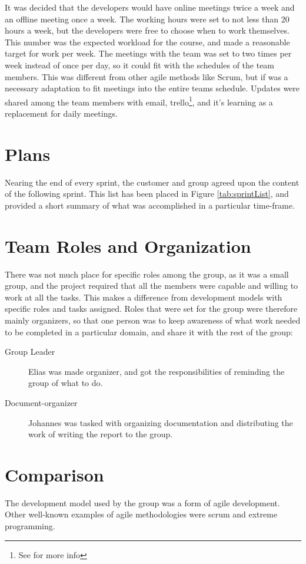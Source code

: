 It was decided that the developers would have online meetings twice a week and an offline meeting once a week. 
The working hours were set to not less than 20 hours a week, but the developers were free to choose when to work themselves. This number was the expected workload for the course, and made a reasonable target for work per week. The meetings with the team was set to two times per week instead of once per day, so it could fit with the schedules of the team members. This was different from other agile methods like Scrum, but if was a necessary adaptation to fit meetings into the entire teams schedule. Updates were shared among the team members with email, trello\footnote{See \pageref{def:trello} for more info}, and it's learning as a replacement for daily meetings.

\section{Plans}

Nearing the end of every sprint, the customer and group agreed upon the content of the following sprint. This list has been placed in Figure \ref{tab:sprintList}, and provided a short summary of what was accomplished in a particular time-frame. 


\section{Team Roles and Organization}
There was not much place for specific roles among the group, as it was a small group, and the project required that all the members were capable and willing to work at all the tasks. This makes a difference from development models with specific roles and tasks assigned. Roles that were set for the group were therefore mainly organizers, so that one person was to keep awareness of what work needed to be completed in a particular domain, and share it with the rest of the group:

\begin{description}

\item[Group Leader] Elias was made organizer, and got the responsibilities of reminding the group of what to do.
\item[Document-organizer] Johannes was tasked with organizing documentation and distributing the work of writing the report to the group. 
\end{description}

\section{Comparison}
The development model used by the group was a form of agile development. Other well-known examples of agile methodologies were scrum and extreme programming. 

